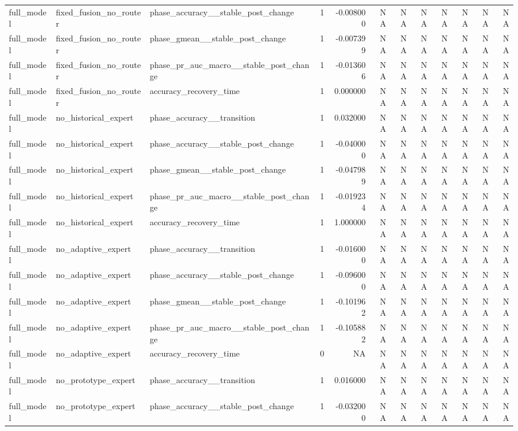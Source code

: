 \begin{tabular}{lllrrrrrrrrr}
full\_model & fixed\_fusion\_no\_router & phase\_accuracy\_\_stable\_post\_change & 1 & -0.008000 & NA & NA & NA & NA & NA & NA & NA \\
full\_model & fixed\_fusion\_no\_router & phase\_gmean\_\_stable\_post\_change & 1 & -0.007399 & NA & NA & NA & NA & NA & NA & NA \\
full\_model & fixed\_fusion\_no\_router & phase\_pr\_auc\_macro\_\_stable\_post\_change & 1 & -0.013606 & NA & NA & NA & NA & NA & NA & NA \\
full\_model & fixed\_fusion\_no\_router & accuracy\_recovery\_time & 1 & 0.000000 & NA & NA & NA & NA & NA & NA & NA \\
full\_model & no\_historical\_expert & phase\_accuracy\_\_transition & 1 & 0.032000 & NA & NA & NA & NA & NA & NA & NA \\
full\_model & no\_historical\_expert & phase\_accuracy\_\_stable\_post\_change & 1 & -0.040000 & NA & NA & NA & NA & NA & NA & NA \\
full\_model & no\_historical\_expert & phase\_gmean\_\_stable\_post\_change & 1 & -0.047989 & NA & NA & NA & NA & NA & NA & NA \\
full\_model & no\_historical\_expert & phase\_pr\_auc\_macro\_\_stable\_post\_change & 1 & -0.019234 & NA & NA & NA & NA & NA & NA & NA \\
full\_model & no\_historical\_expert & accuracy\_recovery\_time & 1 & 1.000000 & NA & NA & NA & NA & NA & NA & NA \\
full\_model & no\_adaptive\_expert & phase\_accuracy\_\_transition & 1 & -0.016000 & NA & NA & NA & NA & NA & NA & NA \\
full\_model & no\_adaptive\_expert & phase\_accuracy\_\_stable\_post\_change & 1 & -0.096000 & NA & NA & NA & NA & NA & NA & NA \\
full\_model & no\_adaptive\_expert & phase\_gmean\_\_stable\_post\_change & 1 & -0.101962 & NA & NA & NA & NA & NA & NA & NA \\
full\_model & no\_adaptive\_expert & phase\_pr\_auc\_macro\_\_stable\_post\_change & 1 & -0.105882 & NA & NA & NA & NA & NA & NA & NA \\
full\_model & no\_adaptive\_expert & accuracy\_recovery\_time & 0 & NA & NA & NA & NA & NA & NA & NA & NA \\
full\_model & no\_prototype\_expert & phase\_accuracy\_\_transition & 1 & 0.016000 & NA & NA & NA & NA & NA & NA & NA \\
full\_model & no\_prototype\_expert & phase\_accuracy\_\_stable\_post\_change & 1 & -0.032000 & NA & NA & NA & NA & NA & NA & NA \\

\end{tabular}
